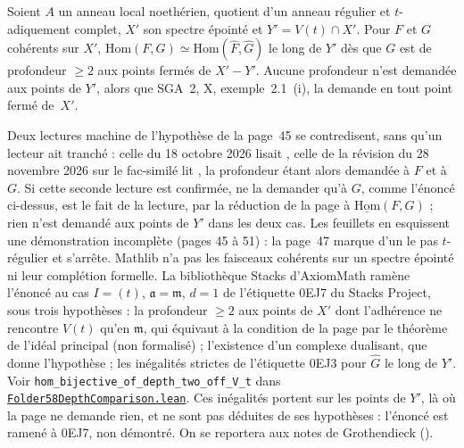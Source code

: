 \begin{encadre}
\begin{theoreme*}\nonverifie
Soient $A$ un anneau local noethérien, quotient d'un anneau régulier et $t$-adiquement complet, $X'$ son spectre épointé et $Y' = V(t) \cap X'$. Pour $F$ et $G$ cohérents sur $X'$, $\mathrm{Hom}(F, G) \simeq \mathrm{Hom}(\hat F, \hat G)$ le long de $Y'$ dès que $G$ est de profondeur $\geq 2$ aux points fermés de $X' - Y'$. Aucune profondeur n'est demandée aux points de $Y'$, alors que SGA~2, X, exemple~2.1~(i), la demande en tout point fermé de~$X'$.
\end{theoreme*}
\end{encadre}
{\small Deux lectures machine de l'hypothèse de la page~45 se contredisent, sans qu'un lecteur ait tranché : celle du 18 octobre 2026 lisait , celle de la révision du 28 novembre 2026 sur le fac-similé lit , la profondeur étant alors demandée à $F$ et à $G$. Si cette seconde lecture est confirmée, ne la demander qu'à $G$, comme l'énoncé ci-dessus, est le fait de la lecture, par la réduction de la page à $\underline{\mathrm{Hom}}(F, G)$ ; rien n'est demandé aux points de $Y'$ dans les deux cas. Les feuillets en esquissent une démonstration incomplète (pages 45 à 51) : la page~47 marque d'un  le pas $t$-régulier et s'arrête. Mathlib n'a pas les faisceaux cohérents sur un spectre épointé ni leur complétion formelle. La bibliothèque Stacks d'AxiomMath \cite{axiomstacks} ramène l'énoncé au cas $I = (t)$, $\mathfrak a = \mathfrak m$, $d = 1$ de l'étiquette 0EJ7 du Stacks Project, sous trois hypothèses : la profondeur $\geq 2$ aux points de $X'$ dont l'adhérence ne rencontre $V(t)$ qu'en $\mathfrak m$, qui équivaut à la condition de la page par le théorème de l'idéal principal (non formalisé) ; l'existence d'un complexe dualisant, que donne l'hypothèse  ; les inégalités strictes de l'étiquette 0EJ3 pour $\hat G$ le long de $Y'$. Voir \texttt{hom\_bijective\_of\_depth\_two\_off\_V\_t} dans \href{\leanblobmain/AlgebraicGeometry/Folder58DepthComparison.lean}{\texttt{Folder58DepthComparison.\allowbreak{}lean}}. Ces inégalités portent sur les points de $Y'$, là où la page ne demande rien, et ne sont pas déduites de ses hypothèses : l'énoncé est ramené à 0EJ7, non démontré. On se reportera aux notes de Grothendieck ().\par}
